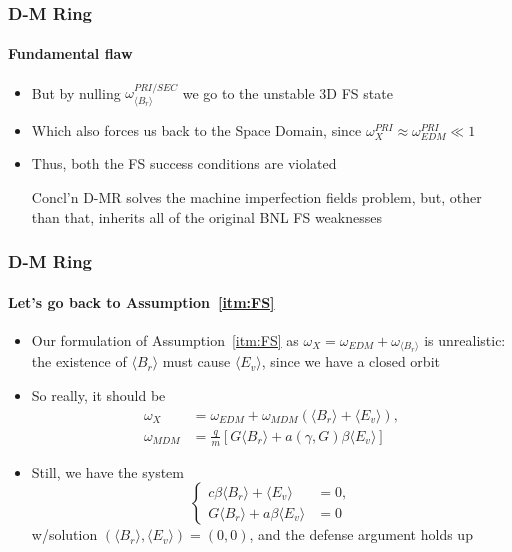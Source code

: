 \documentclass{beamer}
\newcommand{\w}{\omega}
\newcommand{\avg}[1]{\langle{#1}\rangle}
\begin{document}
\begin{frame}\frametitle{D-M Ring}\framesubtitle{Fundamental flaw}
  \begin{itemize}
  \item But by nulling $\w_{\avg{B_r}}^{PRI/SEC}$ we go to the unstable 3D FS state
  \item Which also forces us back to the Space Domain, since $\w_X^{PRI} \approx \w_{EDM}^{PRI} \ll 1$
  \item Thus, both the FS success conditions are violated
  \item[Concl'n] D-MR solves the machine imperfection fields problem, but, other than that,
    inherits all of the original BNL FS weaknesses
  \end{itemize}
\end{frame}
\begin{frame}\frametitle{D-M Ring}\framesubtitle{Let's go back to
    Assumption~\ref{itm:FS}}
\begin{itemize}
\item Our formulation of Assumption~\ref{itm:FS} as 
$\w_X =  \w_{EDM} + \w_{\avg{B_r}}$ is unrealistic: the existence of
  $\avg{B_r}$ must cause $\avg{E_v}$, since we have a closed orbit
\item So really, it should be 
\begin{align*}
\w_X &= \w_{EDM} + \w_{MDM}(\avg{B_r} + \avg{E_v}),\\
\w_{MDM} &= \frac qm\left[G\avg{B_r} + a(\gamma,G)\beta\avg{E_v}\right]
\end{align*}
\item Still, we have the system
\begin{equation*}
  \begin{cases}
    c\beta\avg{B_r}  + \avg{E_v} &= 0, \\
    G\avg{B_r} + a\beta\avg{E_v} &= 0 
  \end{cases}
\end{equation*}
w/solution $(\avg{B_r}, \avg{E_v}) = (0,0)$, and the defense argument holds up
\end{itemize}
\end{frame}
\end{document}

